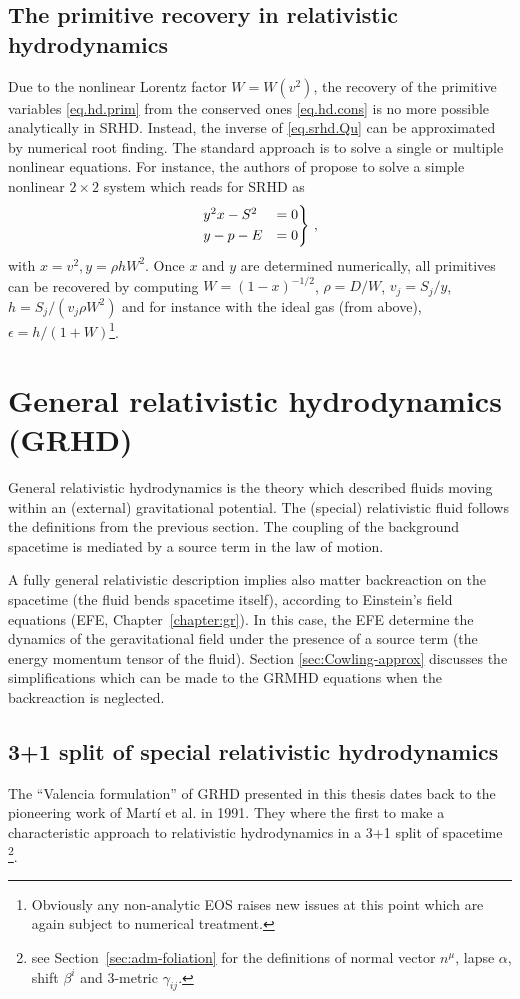 \subsection{The primitive recovery in relativistic hydrodynamics}\label{sec:c2p}
Due to the nonlinear Lorentz factor $W=W(v^2)$, the recovery of the primitive
variables \eqref{eq.hd.prim} from the conserved ones \eqref{eq.hd.cons} is no 
more possible analytically in SRHD. Instead, the inverse of \eqref{eq.srhd.Qu}
can be approximated by numerical root finding. The standard approach is to
solve a single or multiple nonlinear equations. For instance, the authors of
\cite{DelZanna2007,Noble2006} propose to solve a simple nonlinear $2 \times 2$
system which reads for SRHD as
\begin{equation}
\begin{rcases}
  y^2 x - S^2 &= 0 \\
  y - p - E   &= 0 
\end{rcases}\,,
\end{equation}
with $x=v^2, y=\rho h W^2$. Once
$x$ and $y$ are determined numerically, all primitives can be recovered by
computing $W=(1-x)^{-1/2}$, $\rho=D/W$, $v_j=S_j/y$,
$h=S_j/(v_j\rho W^2)$ and for instance with the ideal gas (from above), 
$\epsilon=h/(1+W)$\footnote{Obviously any non-analytic EOS raises new issues at
	this point which are again subject to numerical treatment.}.


\section{General relativistic hydrodynamics (GRHD)}\label{sec:grhd}
General relativistic hydrodynamics is the theory which described fluids moving
within an (external) gravitational potential. The (special) relativistic fluid
follows the definitions from the previous section. The coupling of the
background spacetime is mediated by a source term in the law of motion.

A fully general relativistic description implies also matter backreaction on
the spacetime (the fluid bends spacetime itself), according to Einstein's field
equations (EFE, Chapter~\ref{chapter:gr}). In this case, the EFE determine the
dynamics of the geravitational field under the presence of a source term
(the energy momentum tensor of the fluid). Section \ref{sec:Cowling-approx}
discusses the simplifications which can be made to the GRMHD equations
when the backreaction is neglected.

\subsection{3+1 split of special relativistic hydrodynamics}
The ``Valencia formulation'' of GRHD presented in this thesis dates back to the
pioneering work of Mart\'i et al. \cite{Marti91, Banyuls97, Ibanez01} in 1991.
They where the first to make a characteristic approach to relativistic
hydrodynamics in a 3+1 split of spacetime \footnote{
see Section~\vref{sec:adm-foliation} for the definitions of normal vector 
$n^\mu$, lapse $\alpha$, shift $\beta^i$ and 3-metric $\gamma_{ij}$.}.

